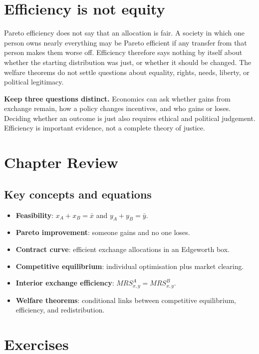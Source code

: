 \section{Efficiency is not equity}

Pareto efficiency does not say that an allocation is fair. A society in which
one person owns nearly everything may be Pareto efficient if any transfer from
that person makes them worse off. Efficiency therefore says nothing by itself
about whether the starting distribution was just, or whether it should be
changed. The welfare theorems do not settle questions about equality, rights,
needs, liberty, or political legitimacy.

\begin{keyidea}
\textbf{Keep three questions distinct.}
Economics can ask whether gains from exchange remain, how a policy changes
incentives, and who gains or loses. Deciding whether an outcome is just also
requires ethical and political judgement. Efficiency is important evidence,
not a complete theory of justice.
\end{keyidea}

\section*{Chapter Review}

\subsection*{Key concepts and equations}
\begin{itemize}
  \item \textbf{Feasibility}: $x_A+x_B=\bar{x}$ and $y_A+y_B=\bar{y}$.
  \item \textbf{Pareto improvement}: someone gains and no one loses.
  \item \textbf{Contract curve}: efficient exchange allocations in an Edgeworth box.
  \item \textbf{Competitive equilibrium}: individual optimisation plus market clearing.
  \item \textbf{Interior exchange efficiency}: $MRS^A_{x,y}=MRS^B_{x,y}$.
  \item \textbf{Welfare theorems}: conditional links between competitive
  equilibrium, efficiency, and redistribution.
\end{itemize}

\section*{Exercises}

